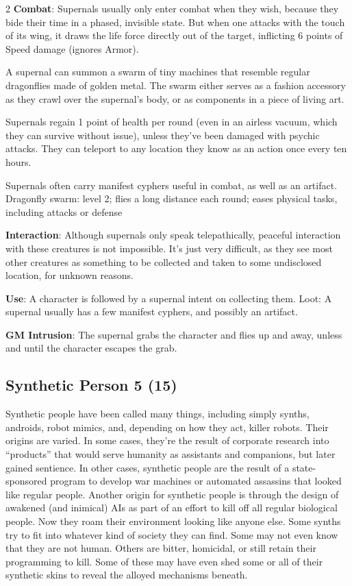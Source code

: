 \begin{multicols}{2}
\textbf{Combat}: Supernals usually only enter combat when they wish, because they bide their time in a phased, invisible state. But when one attacks with the touch of its wing, it draws the life force directly out of the target, inflicting 6 points of Speed damage (ignores Armor). 

A supernal can summon a swarm of tiny machines that resemble regular dragonflies made of golden metal. The swarm either serves as a fashion accessory as they crawl over the supernal’s body, or as components in a piece of living art. 

Supernals regain 1 point of health per round (even in an airless vacuum, which they can survive without issue), unless they’ve been damaged with psychic attacks. They can teleport to any location they know as an action once every ten hours. 

Supernals often carry manifest cyphers useful in combat, as well as an artifact. 
Dragonfly swarm: level 2; flies a long distance each round; eases physical tasks, including attacks or defense

\textbf{Interaction}: Although supernals only speak telepathically, peaceful interaction with these creatures is not impossible. It’s just very difficult, as they see most other creatures as something to be collected and taken to some undisclosed location, for unknown reasons. 

\textbf{Use}: A character is followed by a supernal intent on collecting them. Loot: A supernal usually has a few manifest cyphers, and possibly an artifact.

\textbf{GM Intrusion}: The supernal grabs the character and flies up and away, unless and until the character escapes the grab.

\subsection{Synthetic Person 5 (15)}

Synthetic people have been called many things, including simply synths, androids, robot mimics, and, depending on how they act, killer robots. Their origins are varied. In some cases, they’re the result of corporate research into “products” that would serve humanity as assistants and companions, but later gained sentience. In other cases, synthetic people are the result of a state-sponsored program to develop war machines or automated assassins that looked like regular people. Another origin for synthetic people is through the design of awakened (and inimical) AIs as part of an effort to kill off all regular biological people. Now they roam their environment looking like anyone else. Some synths try to fit into whatever kind of society they can find. Some may not even know that they are not human. Others are bitter, homicidal, or still retain their programming to kill. Some of these may have even shed some or all of their synthetic skins to reveal the alloyed mechanisms beneath. 


\end{multicols}
